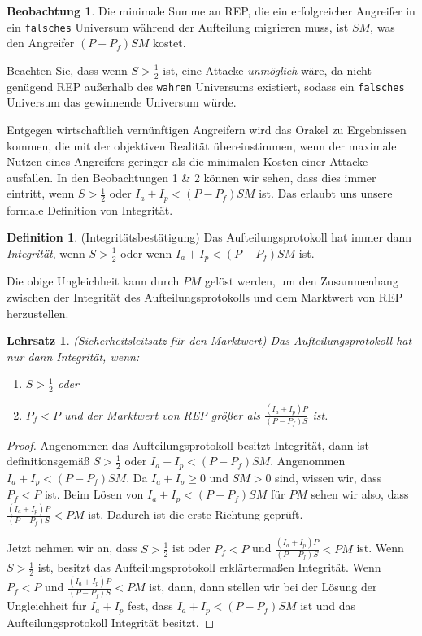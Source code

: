 \documentclass[floatfix,reprint,nofootinbib,amsmath,amssymb,epsfig,pre,floats,letterpaper,groupedaffiliation]{revtex4-1}
\newtheorem{theorem}{Lehrsatz}
\theoremstyle{definition}
\newtheorem{observation}{Beobachtung}
\theoremstyle{definition}
\newtheorem{definition}{Definition}
\theoremstyle{definition}
\begin{document}
\begin{observation}
Die minimale Summe an REP, die ein erfolgreicher Angreifer in ein \texttt{falsches} Universum während der Aufteilung migrieren muss, ist $SM$, was den Angreifer $(P - P_f)SM$ kostet.
\end{observation}

Beachten Sie, dass wenn $S > \frac{1}{2}$ ist, eine Attacke \textit{unmöglich} wäre, da nicht genügend REP außerhalb des \texttt{wahren} Universums existiert, sodass ein \texttt{falsches} Universum das gewinnende Universum würde.

Entgegen wirtschaftlich vernünftigen Angreifern wird das Orakel zu Ergebnissen kommen, die mit der objektiven Realität übereinstimmen, wenn der maximale Nutzen eines Angreifers geringer als die minimalen Kosten einer Attacke ausfallen. In den Beobachtungen 1 \& 2 können wir sehen, dass dies immer eintritt, wenn $S > \frac{1}{2}$ oder $I_a + I_p < (P - P_f)SM$ ist. Das erlaubt uns unsere formale Definition von Integrität.

\begin{definition}\label{ob:integrity_property}
(Integritätsbestätigung) Das Aufteilungsprotokoll hat immer dann \textit{Integrität}, wenn $S > \frac{1}{2}$ oder wenn $I_a + I_p < (P - P_f)SM$ ist.
\end{definition}

Die obige Ungleichheit kann durch $PM$ gelöst werden, um den Zusammenhang zwischen der Integrität des Aufteilungsprotokolls und dem Marktwert von REP herzustellen.

\begin{theorem}\label{th:market_cap_security_theorem}
(Sicherheitsleitsatz für den Marktwert) Das Aufteilungsprotokoll hat nur dann Integrität, wenn:
\begin{enumerate}
\item $S > \frac{1}{2}$ oder
\item $P_f < P$ und der Marktwert von REP größer als $\frac{(I_a + I_p)P}{(P - P_f)S}$ ist.
\end{enumerate}
\end{theorem}

\begin{proof}
Angenommen das Aufteilungsprotokoll besitzt Integrität, dann ist definitionsgemäß $S > \frac{1}{2}$ oder $I_a + I_p < (P - P_f)SM$. Angenommen $I_a + I_p < (P - P_f)SM$. Da $I_a + I_p \geq 0$ und $SM > 0$ sind, wissen wir, dass $P_f < P$ ist. Beim Lösen von $I_a + I_p < (P - P_f)SM$ für $PM$ sehen wir also, dass $\frac{(I_a + I_p)P}{(P - P_f)S} < PM$ ist. Dadurch ist die erste Richtung geprüft.

Jetzt nehmen wir an, dass $S > \frac{1}{2}$ ist oder $P_f < P$ und $\frac{(I_a + I_p)P}{(P - P_f)S} < PM$ ist. Wenn $S > \frac{1}{2}$ ist, besitzt das Aufteilungsprotokoll erklärtermaßen Integrität. Wenn $P_f < P$ und $\frac{(I_a + I_p)P}{(P - P_f)S} < PM$ ist, dann, dann stellen wir bei der Lösung der Ungleichheit für $I_a + I_p$ fest, dass $I_a + I_p < (P-P_f) SM$ ist und das Aufteilungsprotokoll Integrität besitzt.
\end{proof}
\end{document}
